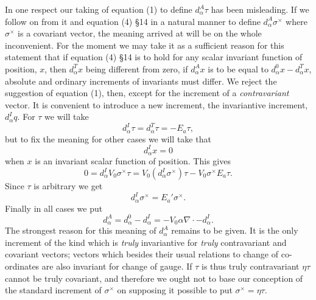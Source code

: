 \documentclass[11pt]{article}
\begin{document}
\indent In one respect our taking of equation (1) to define $d_{\alpha}^{A}\tau$ has been misleading. If we follow on from it and equation (4) §14 in a natural manner to define $d_{\alpha}^{A}\sigma^\times$ where $\sigma^\times$ is a covariant vector, the meaning arrived at will be on the whole inconvenient. For the moment we may take it as a sufficient reason for this statement that if equation (4) §14 is to hold for any scalar invariant function of position, $x$, then $d_{\alpha}^{T}x$ being different from zero, if $d_{\alpha}^{A}x$ is to be equal to $d_{\alpha}^{0}x-d_{\alpha}^{T}x$, absolute and ordinary increments of invariants must differ. We reject the suggestion of equation (1), then, except for the increment of a \emph{contravariant} vector. It is convenient to introduce a new increment, the invariantive increment, $d_{\alpha}^{I}q$. For $\tau$ we will take
\begin{equation}d_{\alpha}^{I}\tau=d_{\alpha}^{T}\tau=-E_a\tau,\tag{5}\end{equation}
but to fix the meaning for other cases we will take that
\begin{equation}d_{\alpha}^{I}x=0\tag{6}\end{equation}
when $x$ is an invariant scalar function of position. This gives
\[
0=d_{\alpha}^{I}V_0\sigma^\times\tau=V_0(d_{\alpha}^{I}\sigma^\times)\tau-V_0\sigma^\times E_a\tau.
\]
Since $\tau$ is arbitrary we get
\begin{equation}d_{\alpha}^{I}\sigma^\times=E_a'\sigma^\times.\tag{7}\end{equation}
Finally in all cases we put
\begin{equation}d_{\alpha}^{A}=d_{\alpha}^{0}-d_{\alpha}^{I}=-V_0\alpha\nabla\cdot-d_{\alpha}^{I}.\tag{8}\end{equation}
The strongest reason for this meaning of $d_{\alpha}^{A}$ remains to be given. It is the only increment of the kind which is \emph{truly} invariantive for \emph{truly} contravariant and covariant vectors; vectors which besides their usual relations to change of co-ordinates are also invariant for change of gauge. If $\tau$ is thus truly contravariant $\eta\tau$ cannot be truly covariant, and therefore we ought not to base our conception of the standard increment of $\sigma^\times$ on supposing it possible to put $\sigma^\times=\eta\tau$.
\end{document}
